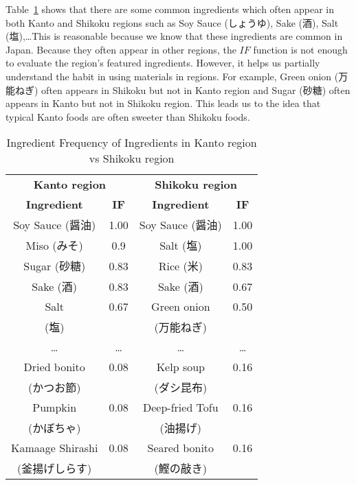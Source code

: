 \begin{CJK}{UTF8}{min}

Table~\ref{tab:IF} shows that there are some common ingredients which often appear in both Kanto and Shikoku regions such as Soy Sauce (しょうゆ), Sake (酒), Salt (塩),\ldots This is reasonable because we know that these ingredients are common in Japan. Because they often appear in other regions, the $IF$ function is not enough to evaluate the region's featured ingredients. However, it helps us partially understand the habit in using materials in regions. For example, Green onion (万能ねぎ) often appears in Shikoku but not in Kanto region and Sugar (砂糖) often appears in Kanto but not in Shikoku region. This leads us to the idea that typical Kanto foods are often sweeter than Shikoku foods. 

\begin{table}

\centering
\caption{Ingredient Frequency of Ingredients in Kanto region vs Shikoku region}
\begin{tabular}{|c|c|c|c|}
\hline
\multicolumn{2}{|c|}{\textbf{\large Kanto region}} & \multicolumn{2}{|c|}{\textbf{\large Shikoku region}} \\
\cline{1-4}

\textbf{Ingredient} &\textbf{ IF} & \textbf{Ingredient} & \textbf{IF}\\ \hline
Soy Sauce (醤油) 	& 1.00 & Soy Sauce (醤油) & 1.00 \\ \hline
Miso (みそ)			& 0.9  &	 Salt (塩)	& 1.00  \\ \hline
Sugar (砂糖) 			& 0.83 & Rice (米) & 0.83 \\ \hline
Sake (酒)				& 0.83 & Sake (酒) & 0.67\\ \hline
Salt 			& 0.67 & Green onion & 0.50\\
(塩) & & (万能ねぎ) & \\ \hline
\ldots &\ldots & \ldots & \ldots \\ \hline
Dried bonito  			& 0.08 	& Kelp soup 	& 0.16  \\ 
(かつお節) & & (ダシ昆布) & \\ \hline
Pumpkin 			& 0.08 & Deep-fried Tofu 	& 0.16  \\ 
(かぼちゃ)  & & (油揚げ) & \\ \hline
Kamaage Shirashi  & 0.08 & Seared bonito  & 0.16  \\ 
(釜揚げしらす)  & & (鰹の敲き) & \\\hline		

\end{tabular}

\label{tab:IF}
\end{table}

\end{CJK}


